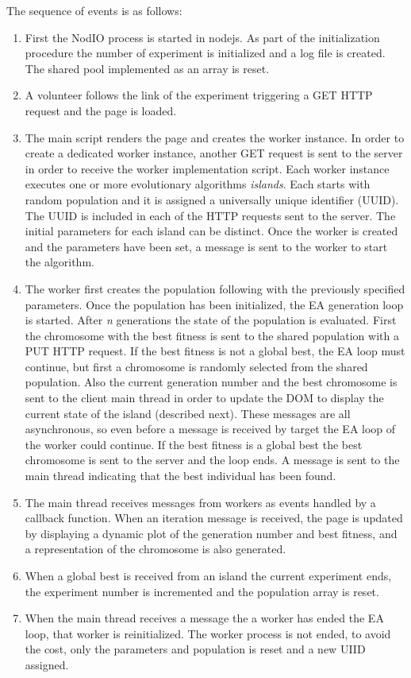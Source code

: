 \documentclass[journal,onecolumn]{IEEEtran}
\begin{document}
The sequence of events is as follows:
\begin{enumerate}
\item First the {\sf NodIO} process is started in nodejs. As part of the
initialization procedure the number of experiment is initialized and a log
file is created. The shared pool implemented as an array is reset.
\item A volunteer follows the link of the experiment triggering a GET HTTP
request and the page is loaded.
\item The main script renders the page and creates the worker instance. In
order to create a dedicated worker instance, another GET request is sent to the
server in order to receive the worker implementation script.
Each worker instance executes one or more evolutionary algorithms
{\em islands}. Each starts with random population and it is assigned a
universally unique  identifier (UUID). The UUID is included in each of the HTTP
requests sent to the server.
The initial parameters for each island
can be distinct. Once the worker is created and the parameters have been set,
a message is sent to the worker to start the algorithm.
\item The worker first creates the population following with the previously
specified parameters. Once the population has been initialized, the EA
generation loop is started. After {\em n} generations the state of the population
is evaluated. First the chromosome with the best fitness is sent to the shared
population with a PUT HTTP request. If the best fitness is not a global best,
the EA loop must continue, but first a chromosome is randomly selected from
the shared population. Also the current generation number and the best
chromosome is sent to the client main thread in order to update the DOM to
display the current state of the island (described next). These messages are
all asynchronous, so even before a message is received by target the EA loop of
the worker could continue. If the best fitness is a global best the best
chromosome is sent to the server and the loop ends. A message is sent to the
main thread indicating that the best individual has been found.
\item The main thread receives messages from workers as events handled by
a callback function. When an iteration message is received, the page is
updated by displaying a dynamic plot of the generation number and best
fitness, and a representation of the chromosome is also generated.
\item When a global best is received from an island the current experiment
ends, the experiment number is incremented and the population array is reset.
\item When the main thread receives a message the a worker has ended the EA
loop, that worker is reinitialized. The worker process is not ended, to
avoid the cost, only the parameters and population is reset and a new UIID
assigned.
\end{enumerate}
\end{document}
